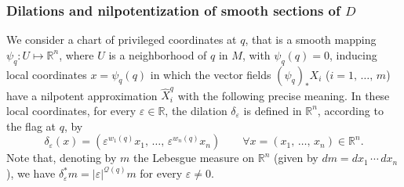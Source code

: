 \documentclass[10pt]{amsart}
\theoremstyle{definition}\newtheorem{defi}[theo]{Definition}\newtheorem{rema}[theo]{Remark}\newtheorem{exam}[theo]{Example}\newtheorem{exem}[theo]{Example}\newtheorem{nota}[theo]{Notation}
\newcommand*\R{\mathbb{R}}
\newcommand{\calQ}{\mathcal{Q}}
\let\oldforall\forall
\renewcommand*{\forall}{\mathrel{\oldforall}}
\begin{document}
\subsubsection{Dilations and nilpotentization of smooth sections of \texorpdfstring{$D$}{D}}\label{sec_nilp_smoothsection}
We consider a chart of privileged coordinates at $q$, that is a smooth mapping $\psi_{q}:U\mapsto\R^n$, where $U$ is a neighborhood of $q$ in $M$, with $\psi_{q}(q)=0$, inducing local coordinates $x=\psi_{q}(q)$ in which the vector fields $(\psi_{q})_*X_i$ ($i=1,\,\ldots,\,m$) have a nilpotent approximation $\widehat{X}^{q}_i$ with the following precise meaning. In these local coordinates, for every $\varepsilon\in\R$, the dilation $\delta_\varepsilon$ is defined in $\R^n$, according to the flag at $q$, by
\[
\delta_\varepsilon(x) = \left(\varepsilon^{w_1(q)} x_1,\,\ldots, \,\varepsilon^{w_n(q)} x_n \right) \qquad\forall x=(x_1,\,\ldots,\,x_n)\in\R^n.
\]
Note that, denoting by $m$ the Lebesgue measure on $\R^n$ (given by $dm=dx_1\,\cdots\,dx_n$), we have $\delta_\varepsilon^*m=\vert\varepsilon\vert^{\calQ(q)}m$ for every $\varepsilon\neq 0$.
\end{document}
